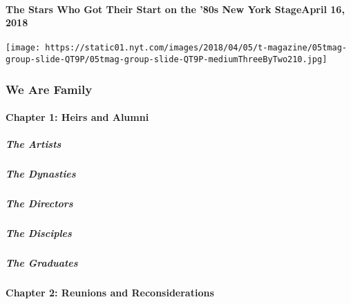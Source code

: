 \hypertarget{the-stars-who-got-their-start-on-the-80s-new-york-stageapril-16-2018}{%
\paragraph{The Stars Who Got Their Start on the '80s New York StageApril
16,
2018}\label{the-stars-who-got-their-start-on-the-80s-new-york-stageapril-16-2018}}

\texttt{[image: https://static01.nyt.com/images/2018/04/05/t-magazine/05tmag-group-slide-QT9P/05tmag-group-slide-QT9P-mediumThreeByTwo210.jpg]}

\hypertarget{we-are-family-1}{%
\subsubsection{We Are Family}\label{we-are-family-1}}

\hypertarget{chapter-1-heirs-and-alumni}{%
\paragraph{Chapter 1: Heirs and
Alumni}\label{chapter-1-heirs-and-alumni}}

\href{/interactive/2020/04/13/t-magazine/black-art-galleries.html}{}

\hypertarget{the-artists}{%
\subparagraph{The Artists}\label{the-artists}}

\href{/interactive/2020/04/13/t-magazine/italian-fashion-design-houses.html}{}

\hypertarget{the-dynasties}{%
\subparagraph{The Dynasties}\label{the-dynasties}}

\href{/interactive/2020/04/13/t-magazine/gordon-parks.html}{}

\hypertarget{the-directors}{%
\subparagraph{The Directors}\label{the-directors}}

\href{/interactive/2020/04/13/t-magazine/enrique-olvera-chef.html}{}

\hypertarget{the-disciples}{%
\subparagraph{The Disciples}\label{the-disciples}}

\href{/interactive/2020/04/13/t-magazine/royal-academy-antwerp.html}{}

\hypertarget{the-graduates}{%
\subparagraph{The Graduates}\label{the-graduates}}

\hypertarget{chapter-2-reunions-and-reconsiderations-1}{%
\paragraph{Chapter 2: Reunions and
Reconsiderations}\label{chapter-2-reunions-and-reconsiderations-1}}

